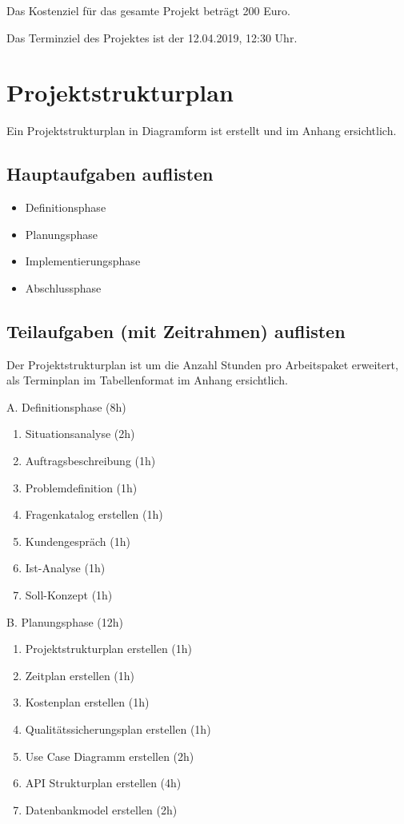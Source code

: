 \documentclass[11pt, a4paper]{article}
\begin{document}
Das Kostenziel für das gesamte Projekt beträgt 200 Euro.

Das Terminziel des Projektes ist der 12.04.2019, 12:30 Uhr.

\section{Projektstrukturplan}
Ein Projektstrukturplan in Diagramform ist erstellt und im Anhang ersichtlich.

\subsection{Hauptaufgaben auflisten}
\begin{itemize}
  \item Definitionsphase
  \item Planungsphase
  \item Implementierungsphase
  \item Abschlussphase
\end{itemize}

\subsection{Teilaufgaben (mit Zeitrahmen) auflisten}
Der Projektstrukturplan ist um die Anzahl Stunden pro Arbeitspaket erweitert,
als Terminplan im Tabellenformat im Anhang ersichtlich.



\noindent A. Definitionsphase (8h)
\begin{enumerate}
  \item Situationsanalyse (2h)
  \item Auftragsbeschreibung (1h)
  \item Problemdefinition (1h)
  \item Fragenkatalog erstellen (1h)
  \item Kundengespräch (1h)
  \item Ist-Analyse (1h)
  \item Soll-Konzept (1h)
\end{enumerate}

\noindent B. Planungsphase (12h)
\begin{enumerate}
  \item Projektstrukturplan erstellen (1h)
  \item Zeitplan erstellen (1h)
  \item Kostenplan erstellen (1h)
  \item Qualitätssicherungsplan erstellen (1h)
  \item Use Case Diagramm erstellen (2h)
  \item API Strukturplan erstellen (4h)
  \item Datenbankmodel erstellen (2h)
\end{enumerate}
\end{document}

